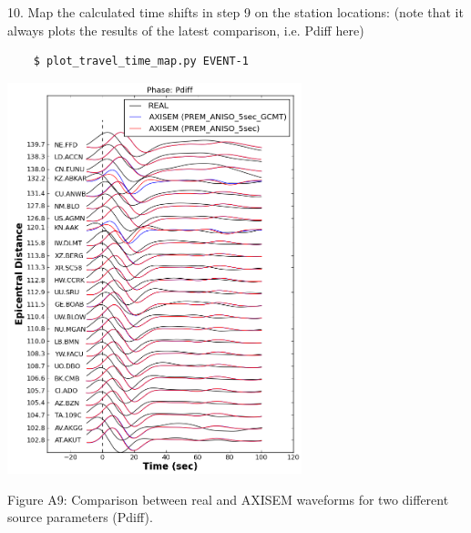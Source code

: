 \documentclass{article}
\begin{document}
\vspace{13pt}
10. Map the calculated time shifts in step 9 on the station locations: (note that 
it always plots the results of the latest comparison, i.e. Pdiff here) 

\begin{verbatim}
    $ plot_travel_time_map.py EVENT-1
\end{verbatim}

\begin{center}
\includegraphics[width=242pt, height=322pt, keepaspectratio=true]{AXISEMTutorial-fig015.png}

{\small{}Figure A9: Comparison between real and AXISEM waveforms for two different 
source parameters (Pdiff).}


\end{center}
\end{document}
